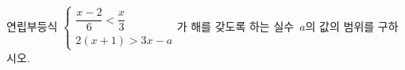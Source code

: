 연립부등식 $\begin{cases} \dfrac{x-2}{6}<\dfrac{x}{3} \\ 2(x+1)>3x-a \end{cases}$가 해를 갖도록 하는 실수~$a$의 값의 범위를 구하시오.
